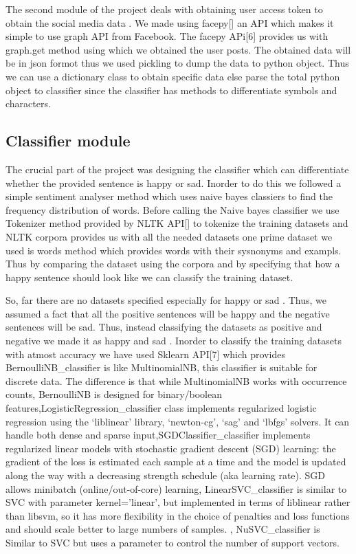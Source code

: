 \documentclass{chi2009}
\begin{document}
\begin{Abstract}
The second module of the project deals with obtaining user access token to obtain the social media data . We made using facepy[] an API which makes it simple to use graph API from Facebook. The facepy APi[6] provides us with graph.get method using which we obtained the user posts. The obtained data will be in json formot thus we used pickling to dump the data to python object. Thus we can use a dictionary class to obtain specific data else parse the total python object to classifier since the classifier has methods to differentiate symbols and characters.  




\subsection{Classifier module}

The crucial part of the project was designing the classifier which can differentiate whether the provided sentence is happy or sad. Inorder to do this we followed a simple sentiment analyser method which uses naive bayes classiers to find the frequency distribution of words. Before calling the Naive bayes classifier we use Tokenizer method provided by NLTK API[] to tokenize the training datasets and NLTK corpora provides us with all the needed datasets one prime dataset we used is words method which provides words with their sysnonyms and exampls. Thus by comparing the dataset using the corpora and by specifying that how a happy sentence should look like we can classify the training dataset. 

So, far there are no datasets specified especially for happy or sad . Thus, we assumed a fact that all the positive sentences will be happy and the negative sentences will be sad. Thus, instead classifying the datasets as positive and negative we made it as happy and sad . Inorder to classify the training datasets with atmost accuracy we have used Sklearn API[7] which provides BernoulliNB_classifier is like MultinomialNB, this classifier is suitable for discrete data. The difference is that while MultinomialNB works with occurrence counts, BernoulliNB is designed for binary/boolean features,LogisticRegression_classifier class implements regularized logistic regression using the ‘liblinear’ library, ‘newton-cg’, ‘sag’ and ‘lbfgs’ solvers. It can handle both dense and sparse input,SGDClassifier_classifier implements regularized linear models with stochastic gradient descent (SGD) learning: the gradient of the loss is estimated each sample at a time and the model is updated along the way with a decreasing strength schedule (aka learning rate). SGD allows minibatch (online/out-of-core) learning, LinearSVC_classifier is similar to SVC with parameter kernel=’linear’, but implemented in terms of liblinear rather than libsvm, so it has more flexibility in the choice of penalties and loss functions and should scale better to large numbers of samples. , NuSVC_classifier is Similar to SVC but uses a parameter to control the number of support vectors. 


\end{Abstract}
\end{document}

